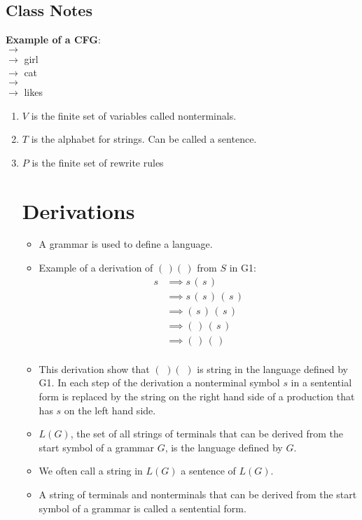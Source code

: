 \documentclass[]{article}
\begin{document}
  \subsection*{Class Notes}
    \textbf{Example of a CFG}: \\
        $\rightarrow$  \\
     $\rightarrow$ girl \\
     $\rightarrow$ cat  \\
     $\rightarrow$  \\
            $\rightarrow$ likes
    \begin{enumerate}
      \item $V$ is the finite set of variables called nonterminals.
      \item $T$ is the alphabet for strings. Can be called a sentence.
      \item $P$ is the finite set of rewrite rules

\section{Derivations}
  \begin{itemize}
    \item A grammar is used to define a language.
    \item Example of a derivation of $(\,)(\,)$ from $S$ in G1:
      \begin{align*}
        s & \implies s \, (\,s\,)            \\
          & \implies s \, (\,s\,) \, (\,s\,) \\
          & \implies      (\,s\,) \, (\,s\,) \\
          & \implies      (\,   ) \, (\,s\,) \\
          & \implies      (\,   ) \, (\,   ) \\ 
      \end{align*}
    \item This derivation show that $(\,\,)(\,\,)$ is string in the language
    defined by G1. In each step of the derivation a nonterminal symbol $s$ in a
    sentential form is replaced by the string on the right hand side of a 
    production that has $s$ on the left hand side.
    \item $L(G)$, the set of all strings of terminals that can be derived from
    the start symbol of a grammar $G$, is the language defined by $G$.
    \item We often call a string in $L(G)$ a sentence of $L(G)$.
    \item A string of terminals and nonterminals that can be derived from the 
    start symbol of a grammar is called a sentential form.
  \end{itemize}

\end{enumerate}
\end{document}
